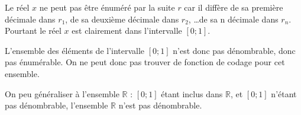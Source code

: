 \begin{enumerate}
Le réel $x$ ne peut pas être énuméré par la suite $r$ car il diffère de sa première décimale dans $r_1$, de sa deuxième décimale dans $r_2$, \ldots de sa n décimale dans $r_n$. Pourtant le réel $x$ est clairement dans l'intervalle $[0;1]$.

L'ensemble des éléments de l'intervalle $[0;1]$ n'est donc pas dénombrable, donc pas énumérable. On ne peut donc pas trouver de fonction de codage pour cet ensemble.

On peu généraliser à l'ensemble $\mathbb{R}$ : $[0;1]$ étant inclus dans $\mathbb{R}$, et $[0;1]$ n'étant pas dénombrable, l'ensemble $\mathbb{R}$ n'est pas dénombrable.

\end{enumerate}